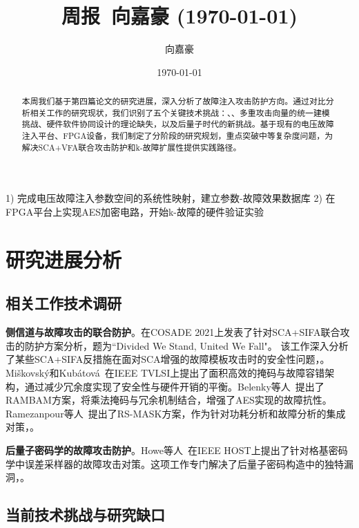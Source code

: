 \documentclass{article}
\title{周报~向嘉豪 (\today)}
\author{向嘉豪}
\date{\today}
\begin{document}
\maketitle

\begin{abstract}
本周我们基于第四篇论文的研究进展，深入分析了故障注入攻击防护方向。通过对比分析相关工作的研究现状，我们识别了五个关键技术挑战：、、多重攻击向量的统一建模挑战、硬件软件协同设计的理论缺失，以及后量子时代的新挑战。基于现有的电压故障注入平台、FPGA设备，我们制定了分阶段的研究规划，重点突破中等复杂度问题，为解决SCA+VFA联合攻击防护和k-故障扩展性提供实践路径。
\end{abstract}

\begin{weekplan}
1) 完成电压故障注入参数空间的系统性映射，建立参数-故障效果数据库
2) 在FPGA平台上实现AES加密电路，开始k-故障的硬件验证实验
\end{weekplan}

\section{研究进展分析}

\subsection{相关工作技术调研}

\textbf{侧信道与故障攻击的联合防护}。\cite{COSADE:SahBagJapMuk21}在COSADE 2021上发表了针对SCA+SIFA联合攻击的防护方案分析，题为``Divided We Stand, United We Fall"。
该工作深入分析了某些SCA+SIFA反措施在面对SCA增强的故障模板攻击时的安全性问题，。
Miškovský和Kubátová~\cite{IEEE-TVLSI:MisKub21}在IEEE TVLSI上提出了面积高效的掩码与故障容错架构，通过减少冗余度实现了安全性与硬件开销的平衡。Belenky等人~\cite{TCHES:BelBugAzr22}提出了RAMBAM方案，将乘法掩码与冗余机制结合，增强了AES实现的故障抗性。
Ramezanpour等人~\cite{IEEE-TCAD:RamAmp20}提出了RS-MASK方案，作为针对功耗分析和故障分析的集成对策，。

\textbf{后量子密码学的故障攻击防护}。Howe等人~\cite{IEEE-HOST:HowKhaMarNor19}在IEEE HOST上提出了针对格基密码学中误差采样器的故障攻击对策。这项工作专门解决了后量子密码构造中的独特漏洞，。


\subsection{当前技术挑战与研究缺口}
\end{document}
